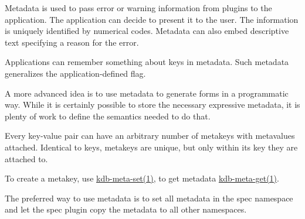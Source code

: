 \begin{DoxyItemize}
\item Metadata is used to pass error or warning information from plugins to the application. The application can decide to present it to the user. The information is uniquely identified by numerical codes. Metadata can also embed descriptive text specifying a reason for the error.
\item Applications can remember something about keys in metadata. Such metadata generalizes the application-\/defined flag.
\item A more advanced idea is to use metadata to generate forms in a programmatic way. While it is certainly possible to store the necessary expressive metadata, it is plenty of work to define the semantics needed to do that.
\end{DoxyItemize}

Every key-\/value pair can have an arbitrary number of metakeys with metavalues attached. Identical to keys, metakeys are unique, but only within its key they are attached to.

To create a metakey, use \mbox{\hyperlink{doc_help_kdb-meta-set_md}{kdb-\/meta-\/set(1)}}, to get metadata \mbox{\hyperlink{doc_help_kdb-meta-get_md}{kdb-\/meta-\/get(1)}}.

The preferred way to use metadata is to set all metadata in the {\ttfamily spec} namespace and let the {\ttfamily spec} plugin copy the metadata to all other namespaces. 